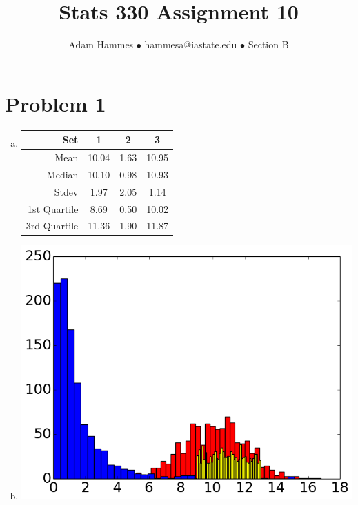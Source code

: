 \documentclass[11pt]{article}
\begin{document}
\title{\vspace{-8ex}Stats 330 Assignment 10}
\author{Adam Hammes $\bullet$ hammesa@iastate.edu $\bullet$ Section B}
\maketitle


\section*{Problem 1}

\begin{enumerate}[(a)]
\item
	\begin{tabular}{ r | c | c | c}
		Set & 1 & 2 & 3 \\
		\hline
		Mean & 10.04 & 1.63 & 10.95 \\
		\hline
		Median & 10.10 & 0.98 & 10.93 \\
		\hline
		Stdev & 1.97 & 2.05 & 1.14 \\
		\hline
		1st Quartile & 8.69 & 0.50 & 10.02 \\
		\hline
		3rd Quartile & 11.36 & 1.90 & 11.87
	\end{tabular}

\item {} {
	\includegraphics[scale = 0.7]{Histogram.png}
	}


\end{enumerate}
\end{document}
